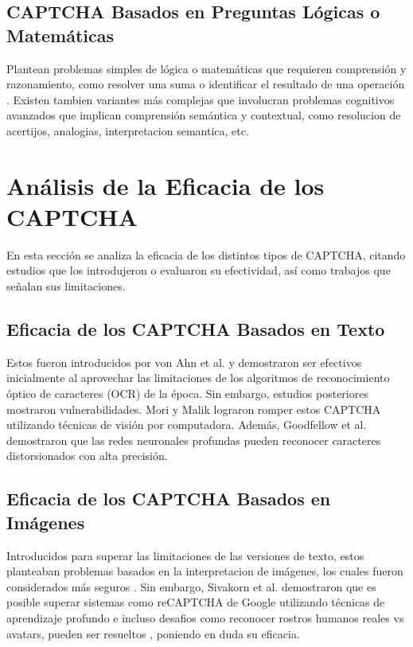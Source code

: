 \documentclass[conference]{IEEEtran}
\begin{document}
\subsection{CAPTCHA Basados en Preguntas Lógicas o Matemáticas}

Plantean problemas simples de lógica o matemáticas que requieren comprensión y razonamiento, como resolver una suma o identificar el resultado de una operación \cite{HernandezCastro2010}. Existen tambien variantes más complejas que involucran problemas cognitivos avanzados que implican comprensión semántica y contextual, como resolucion de acertijos, analogias, interpretacion semantica, etc. \cite{Algwil2023}

\section{Análisis de la Eficacia de los CAPTCHA}

En esta sección se analiza la eficacia de los distintos tipos de CAPTCHA, citando estudios que los introdujeron o evaluaron su efectividad, así como trabajos que señalan sus limitaciones.

\subsection{Eficacia de los CAPTCHA Basados en Texto}

Estos fueron introducidos por von Ahn et al. \cite{VonAhn2003} y demostraron ser efectivos inicialmente al aprovechar las limitaciones de los algoritmos de reconocimiento óptico de caracteres (OCR) de la época. Sin embargo, estudios posteriores mostraron vulnerabilidades. Mori y Malik \cite{Mori2003} lograron romper estos CAPTCHA utilizando técnicas de visión por computadora. Además, Goodfellow et al. \cite{Goodfellow2014} demostraron que las redes neuronales profundas pueden reconocer caracteres distorsionados con alta precisión.

\subsection{Eficacia de los CAPTCHA Basados en Imágenes}

Introducidos para superar las limitaciones de las versiones de texto, estos planteaban problemas basados en la interpretacion de imágenes, los cuales fueron considerados más seguros \cite{Gossweiler2009}. Sin embargo, Sivakorn et al. \cite{Sivakorn2016} demostraron que es posible superar sistemas como reCAPTCHA de Google utilizando técnicas de aprendizaje profundo e incluso desafios como reconocer rostros humanos reales vs avatars, pueden ser resueltos \cite{Zhu2010}, poniendo en duda su eficacia.
\end{document}

